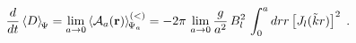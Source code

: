 \begin{equation}
\frac{d}{dt}
\left\langle
D
\right\rangle_{\scriptstyle \!  \Psi}
 = 
\lim_{a \rightarrow 0}
\left\langle
{\mathcal A_{a}} ({\bf r})
\right\rangle_{\scriptstyle \!  \Psi_{a}}^{(<)}
=
- 2 \pi \,
\lim_{a \rightarrow 0}
\frac{g}{a^{2}} \, B_{l}^{2} \,
\int_{0}^{a} dr r \left[ J_{l} (\tilde{k} r) \right]^{2}
\;  .
\label{eq:anomaly_internal_region}
\end{equation}

